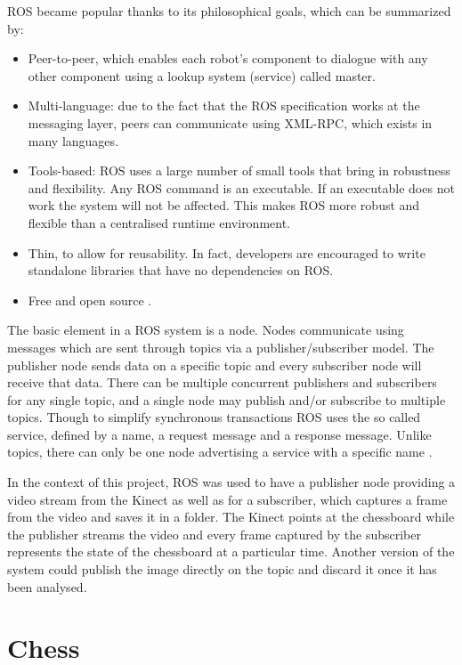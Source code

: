 \documentclass{l4proj}
\begin{document}
ROS became popular thanks to its philosophical goals, which can be summarized by:
\begin{itemize}
	\item Peer-to-peer, which enables each robot's component to dialogue with any other component using a lookup system (service) called master.
	\item Multi-language: due to the fact that the ROS specification works at the messaging layer, peers can communicate using XML-RPC, which exists in many languages.
	\item Tools-based: ROS uses a large number of small tools that bring in robustness and flexibility. Any ROS command is an executable. If an executable does not work the system will not be affected. This makes ROS more robust and flexible than a centralised runtime environment.
	\item Thin, to allow for reusability. In fact, developers are encouraged to write standalone libraries that have no dependencies on ROS.
	\item Free and open source \cite{ROS}.
\end{itemize}

The basic element in a ROS system is a node. Nodes communicate using messages which are sent through topics via a publisher/subscriber model. The publisher node sends data on a specific topic and every subscriber node will receive that data. There can be multiple concurrent publishers and subscribers for any single topic, and a single node may publish and/or subscribe to multiple topics. Though to simplify synchronous transactions ROS uses the so called service, defined by a name, a request message and a response message. Unlike topics, there can only be one node advertising a service with a specific name \cite{ROSPaper}.

In the context of this project, ROS was used to have a publisher node providing a video stream from the Kinect as well as for a subscriber, which captures a frame from the video and saves it in a folder. The Kinect points at the chessboard while the publisher streams the video and every frame captured by the subscriber represents the state of the chessboard at a particular time. Another version of the system could publish the image directly on the topic and discard it once it has been analysed.

\section{Chess}
\end{document}
